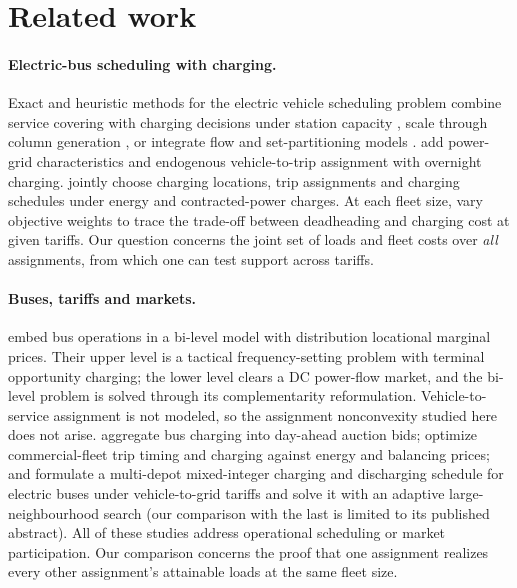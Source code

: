 \documentclass[11pt]{article}
\theoremstyle{definition}\newtheorem{definition}[theorem]{Definition}
\theoremstyle{remark}\newtheorem{remark}[theorem]{Remark}
\begin{document}
\section{Related work}\label{sec:related}

\paragraph{Electric-bus scheduling with charging.}
Exact and heuristic methods for the electric vehicle scheduling problem combine
service covering with charging decisions under station capacity
\citep{devos2024capacity}, scale through column generation
\citep{parmentier2023fleets}, or integrate flow and set-partitioning models
\citep{borndorfer2024integrated}. \citet{wu2022grid} add power-grid
characteristics and endogenous vehicle-to-trip assignment with overnight
charging. \citet[Sec.~4.2]{nath2024joint} jointly choose charging locations,
trip assignments and charging schedules under energy and contracted-power
charges. At each fleet size, \citet[Sec.~4.2]{dabcevic2026pareto} vary objective
weights to trace the trade-off between deadheading and charging cost at given
tariffs. Our question concerns the joint set of loads and fleet costs over
\emph{all} assignments, from which one can test support across tariffs.

\paragraph{Buses, tariffs and markets.}
\citet{wu2019gridinteractive} embed bus operations in a bi-level model with
distribution locational marginal prices. Their upper level is a tactical
frequency-setting problem with terminal opportunity charging; the lower level
clears a DC power-flow market, and the bi-level problem is solved through its
complementarity reformulation. Vehicle-to-service assignment is not modeled, so
the assignment nonconvexity studied here does not arise. \citet{zoltowskaLin2021}
aggregate bus charging into day-ahead auction bids;
\citet{blatiak2022v2g} optimize commercial-fleet trip timing and charging
against energy and balancing prices; and \citet{zhou2025v2g} formulate a
multi-depot mixed-integer charging and discharging schedule for electric buses
under vehicle-to-grid tariffs and solve it with an adaptive large-neighbourhood
search (our comparison with the last is limited to its published abstract). All of
these studies address operational scheduling or market participation. Our
comparison concerns the proof that one assignment realizes every other
assignment's attainable loads at the same fleet size.
\end{document}
